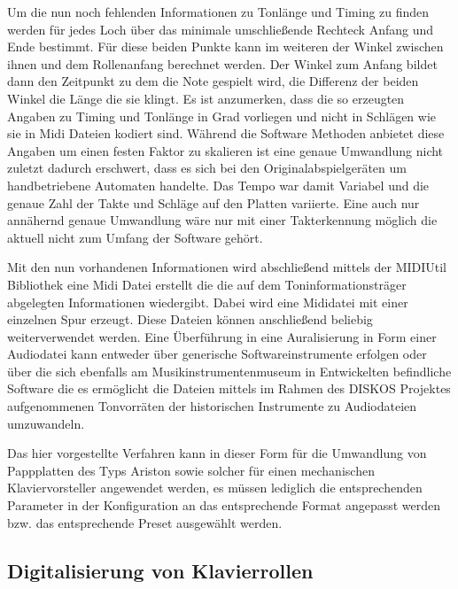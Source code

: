 Um die nun noch fehlenden Informationen zu Tonlänge und Timing zu finden werden für jedes Loch über das minimale umschließende Rechteck Anfang und Ende bestimmt.
Für diese beiden Punkte kann im weiteren der Winkel zwischen ihnen und dem Rollenanfang berechnet werden. %
Der Winkel zum Anfang bildet dann den Zeitpunkt zu dem die Note gespielt wird, die Differenz der beiden Winkel die Länge die sie klingt.
Es ist anzumerken, dass die so erzeugten Angaben zu Timing und Tonlänge in Grad vorliegen und nicht in Schlägen wie sie in Midi Dateien kodiert sind.
Während die Software Methoden anbietet diese Angaben um einen festen Faktor zu skalieren ist eine genaue Umwandlung nicht zuletzt dadurch erschwert, dass es sich bei den Originalabspielgeräten um handbetriebene Automaten handelte.
Das Tempo war damit Variabel und die genaue Zahl der Takte und Schläge auf den Platten variierte.
Eine auch nur annähernd genaue Umwandlung wäre nur mit einer Takterkennung möglich die aktuell nicht zum Umfang der Software gehört.


Mit den nun vorhandenen Informationen wird abschließend mittels der MIDIUtil Bibliothek \parencite[]{midiutil} eine Midi Datei erstellt die die auf dem Toninformationsträger abgelegten Informationen wiedergibt.
Dabei wird eine Mididatei mit einer einzelnen Spur erzeugt.
Diese Dateien können anschließend beliebig weiterverwendet werden.
Eine Überführung in eine Auralisierung in Form einer Audiodatei kann entweder über generische Softwareinstrumente erfolgen oder über die sich ebenfalls am Musikinstrumentenmuseum in Entwickelten befindliche  \parencite[]{midiauralizer} Software die es ermöglicht die Dateien mittels im Rahmen des DISKOS Projektes aufgenommenen Tonvorräten der historischen Instrumente zu Audiodateien umzuwandeln.

Das hier vorgestellte Verfahren kann in dieser Form für die Umwandlung von Pappplatten des Typs Ariston sowie solcher für einen mechanischen Klaviervorsteller angewendet werden, es müssen lediglich die entsprechenden Parameter in der Konfiguration an das entsprechende Format angepasst werden bzw. das entsprechende Preset ausgewählt werden. 

\subsection{Digitalisierung von Klavierrollen}

